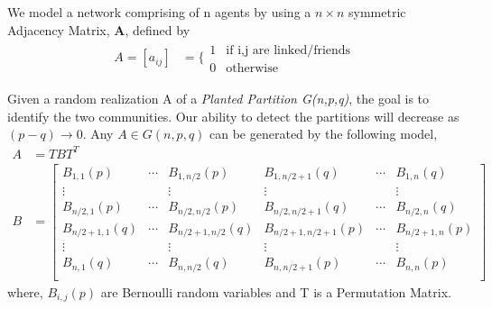 \documentclass[9pt]{article}
\begin{document}
 


We model a network comprising of n agents by using a $n \times n$ symmetric Adjacency Matrix, $\mathbf{A}$, defined by
\begin{align}
A = [a_{ij}] &= \bigg\lbrace \begin{array}{cc}
1 & \text{if i,j are linked/friends}\\
0 & \text{otherwise}
\end{array} \label{eq:AdjacencyMatrix}
\end{align}

Given a random realization A of a \emph{Planted Partition G(n,p,q)}, the goal is to identify the two communities. Our ability to detect the partitions will decrease as $(p-q) \to 0$. Any $A \in G(n,p,q)$ can be generated by the following model, 
\begin{align}
A &= TBT^T \label{eq:RandomAdjacencyMatrix}\\
B &=  \begin{bmatrix}
B_{1,1}(p) & \cdots & B_{1,n/2}(p) &B_{1,n/2 + 1}(q) & \cdots & B_{1,n}(q)\\
\vdots& & \vdots& \vdots & &\vdots\\
B_{n/2,1}(p) & \cdots & B_{n/2,n/2}(p) &B_{n/2,n/2 + 1}(q) & \cdots & B_{n/2,n}(q)\\
B_{n/2+1,1}(q) & \cdots & B_{n/2+1,n/2}(q) &B_{n/2+1,n/2 + 1}(p) & \cdots & B_{n/2+1,n}(p)\\
\vdots& & \vdots& \vdots & &\vdots\\
B_{n,1}(q) & \cdots & B_{n,n/2}(q) &B_{n,n/2 + 1}(p) & \cdots & B_{n,n}(p)\\
\end{bmatrix} \label{eq:OrderedClusterAdjacencyMatrix}
\end{align}
where, $B_{i,j}(p)$ are Bernoulli random variables and T is a Permutation Matrix. 
\end{document}
